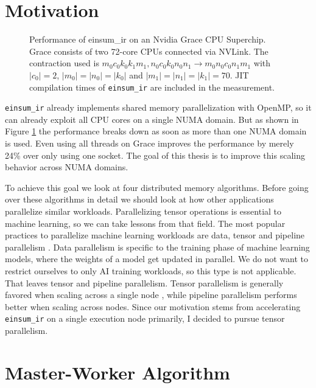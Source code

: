 
\section{Motivation}

\begin{figure}[ht]
  \caption{
    Performance of einsum\_ir on an Nvidia Grace CPU Superchip.
    Grace consists of two 72-core CPUs connected via NVLink.
    The contraction used is $m_0c_0k_0k_1m_1, n_0c_0k_0n_0n_1 \rightarrow m_0n_0c_0n_1m_1$ with $|c_0|=2$, $|m_0|=|n_0|=|k_0|$ and $|m_1|=|n_1|=|k_1|=70$.
    JIT compilation times of \texttt{einsum\_ir} are included in the measurement.
    }
  \label{fig:perf_threads}
\end{figure}

\texttt{einsum\_ir} already implements shared memory parallelization with OpenMP\cite{openMP}, so it can already exploit all CPU cores on a single NUMA domain.
But as shown in Figure \ref{fig:perf_threads} the performance breaks down as soon as more than one NUMA domain is used.
Even using all threads on Grace improves the performance by merely 24\% over only using one socket.
The goal of this thesis is to improve this scaling behavior across NUMA domains.

To achieve this goal we look at four distributed memory algorithms.
Before going over these algorithms in detail we should look at how other applications parallelize similar workloads.
Parallelizing tensor operations is essential to machine learning, so we can take lessons from that field.
The most popular practices to parallelize machine learning workloads are data, tensor and pipeline parallelism \cite{megatronLM}.
Data parallelism is specific to the training phase of machine learning models, where the weights of a model get updated in parallel.
We do not want to restrict ourselves to only AI training workloads, so this type is not applicable.
That leaves tensor and pipeline parallelism.
Tensor parallelism is generally favored when scaling across a single node \cite{megatronLM}, while pipeline parallelism performs better when scaling across nodes.
Since our motivation stems from accelerating \texttt{einsum\_ir} on a single execution node primarily, I decided to pursue tensor parallelism.


\section{Master-Worker Algorithm}

